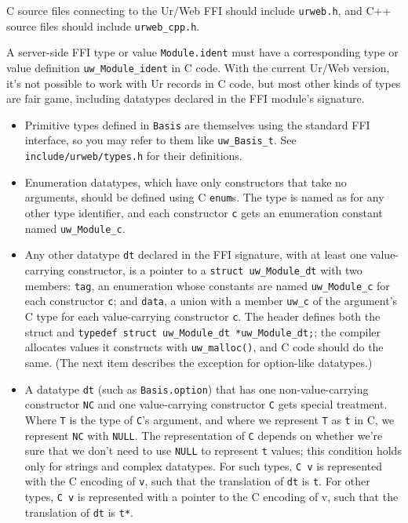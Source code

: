 \documentclass{article}
\begin{document}
C source files connecting to the Ur/Web FFI should include \texttt{urweb.h}, and C++ source files should include \texttt{urweb\_cpp.h}.

A server-side FFI type or value \texttt{Module.ident} must have a corresponding type or value definition \texttt{uw\_Module\_ident} in C code.  With the current Ur/Web version, it's not possible to work with Ur records in C code, but most other kinds of types are fair game, including datatypes declared in the FFI module's signature.

\begin{itemize}
  \item Primitive types defined in \texttt{Basis} are themselves using the standard FFI interface, so you may refer to them like \texttt{uw\_Basis\_t}.  See \texttt{include/urweb/types.h} for their definitions.
  \item Enumeration datatypes, which have only constructors that take no arguments, should be defined using C \texttt{enum}s.  The type is named as for any other type identifier, and each constructor \texttt{c} gets an enumeration constant named \texttt{uw\_Module\_c}.
  \item Any other datatype \texttt{dt} declared in the FFI signature, with at least one value-carrying constructor, is a pointer to a \texttt{struct uw\_Module\_dt} with two members: \texttt{tag}, an enumeration whose constants are named \texttt{uw\_Module\_c} for each constructor \texttt{c}; and \texttt{data}, a union with a member \texttt{uw\_c} of the argument's C type for each value-carrying constructor \texttt{c}.  The header defines both the struct and \texttt{typedef struct uw\_Module\_dt *uw\_Module\_dt;}; the compiler allocates values it constructs with \texttt{uw\_malloc()}, and C code should do the same.  (The next item describes the exception for option-like datatypes.)
  \item A datatype \texttt{dt} (such as \texttt{Basis.option}) that has one non-value-carrying constructor \texttt{NC} and one value-carrying constructor \texttt{C} gets special treatment.  Where \texttt{T} is the type of \texttt{C}'s argument, and where we represent \texttt{T} as \texttt{t} in C, we represent \texttt{NC} with \texttt{NULL}.  The representation of \texttt{C} depends on whether we're sure that we don't need to use \texttt{NULL} to represent \texttt{t} values; this condition holds only for strings and complex datatypes.  For such types, \texttt{C v} is represented with the C encoding of \texttt{v}, such that the translation of \texttt{dt} is \texttt{t}.  For other types, \texttt{C v} is represented with a pointer to the C encoding of v, such that the translation of \texttt{dt} is \texttt{t*}.

\end{itemize}
\end{document}

